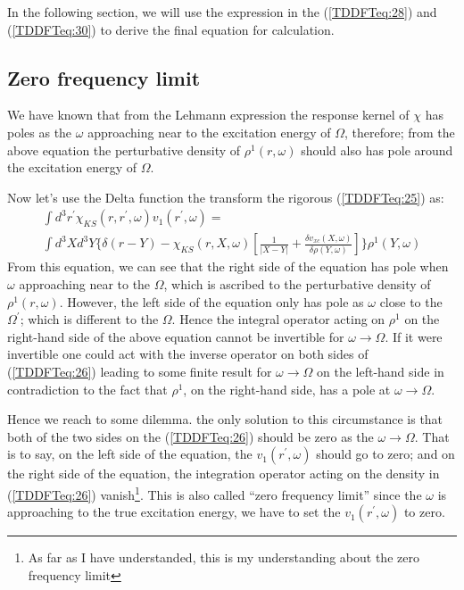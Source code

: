 In the following section, we will use the expression in the
(\ref{TDDFTeq:28}) and (\ref{TDDFTeq:30}) to derive the final
equation for calculation.

\subsection{Zero frequency limit}
%
%
%
%
%
We have known that from the Lehmann expression the response kernel
of $\chi$ has poles as the $\omega$ approaching near to the
excitation energy of $\Omega$, therefore; from the above equation
the perturbative density of $\rho^{1}(r,\omega)$ should also has
pole around the excitation energy of $\Omega$.

Now let's  use the Delta function the transform the rigorous
(\ref{TDDFTeq:25}) as:
\begin{multline}\label{TDDFTeq:26}
\int d^{3}r^{'}\chi_{KS}(r,r^{'},\omega)
v_{1}(r^{'},\omega) = \\
\int d^{3}X d^{3}Y \Bigg\{\delta(r-Y) -
\chi_{KS}(r,X,\omega) \left[ \frac{1}{|X-Y|} +
\frac{\delta v_{xc}(X,\omega)}{\delta \rho(Y,\omega)} \right]
\Bigg\}\rho^{1}(Y,\omega)
\end{multline}
From this equation, we can see that the right side of the equation
has pole when $\omega$ approaching near to the $\Omega$, which is
ascribed to the perturbative density of $\rho^{1}(r, \omega)$.
However, the left side of the equation only has pole as $\omega$
close to the $\Omega^{'}$; which is different to the $\Omega$. Hence
the integral operator acting on $\rho^{1}$ on the right-hand side of
the above equation cannot be invertible for $\omega \rightarrow
\Omega$. If it were invertible one could act with the inverse
operator on both sides of (\ref{TDDFTeq:26}) leading to some finite
result for $\omega \rightarrow \Omega$ on the left-hand side in
contradiction to the fact that $\rho^{1}$, on the right-hand side,
has a pole at $\omega \rightarrow \Omega$.

Hence we reach to some dilemma. the only solution to this circumstance
is that both of the two sides on the (\ref{TDDFTeq:26}) should be zero
as the $\omega \rightarrow \Omega$. That is to say, on the left side of
the equation, the $v_{1}(r^{'},\omega)$ should go to zero; and on the
right side of the equation, the integration operator acting on the
density in (\ref{TDDFTeq:26}) vanish\footnote{As far as
I have understanded, this is my understanding about the zero frequency
limit}. This is also called ``zero frequency limit'' since the $\omega$
is approaching to the true excitation energy, we have to set the
$v_{1}(r^{'},\omega)$ to zero.

